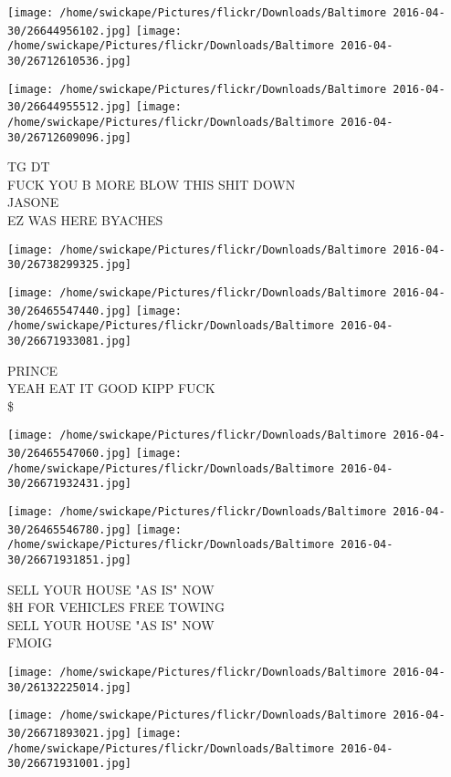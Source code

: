 \documentclass[10pt,letterpaper]{article}
\begin{document}
\texttt{[image: /home/swickape/Pictures/flickr/Downloads/Baltimore 2016-04-30/26644956102.jpg]}
\texttt{[image: /home/swickape/Pictures/flickr/Downloads/Baltimore 2016-04-30/26712610536.jpg]}

\texttt{[image: /home/swickape/Pictures/flickr/Downloads/Baltimore 2016-04-30/26644955512.jpg]}
\texttt{[image: /home/swickape/Pictures/flickr/Downloads/Baltimore 2016-04-30/26712609096.jpg]}

TG DT\\
FUCK YOU B MORE BLOW THIS SHIT DOWN\\
JASONE\\
EZ WAS HERE BYACHES\\
\pagebreak

\texttt{[image: /home/swickape/Pictures/flickr/Downloads/Baltimore 2016-04-30/26738299325.jpg]}

\vspace{0.25in}
\texttt{[image: /home/swickape/Pictures/flickr/Downloads/Baltimore 2016-04-30/26465547440.jpg]}
\texttt{[image: /home/swickape/Pictures/flickr/Downloads/Baltimore 2016-04-30/26671933081.jpg]}

PRINCE\\
YEAH EAT IT GOOD KIPP FUCK\\
\$\\
\pagebreak

\texttt{[image: /home/swickape/Pictures/flickr/Downloads/Baltimore 2016-04-30/26465547060.jpg]}
\texttt{[image: /home/swickape/Pictures/flickr/Downloads/Baltimore 2016-04-30/26671932431.jpg]}

\texttt{[image: /home/swickape/Pictures/flickr/Downloads/Baltimore 2016-04-30/26465546780.jpg]}
\texttt{[image: /home/swickape/Pictures/flickr/Downloads/Baltimore 2016-04-30/26671931851.jpg]}

SELL YOUR HOUSE "AS IS" NOW\\
\$H FOR VEHICLES FREE TOWING\\
SELL YOUR HOUSE "AS IS" NOW\\
FMOIG\\
\pagebreak

\texttt{[image: /home/swickape/Pictures/flickr/Downloads/Baltimore 2016-04-30/26132225014.jpg]}

\vspace{0.25in}
\texttt{[image: /home/swickape/Pictures/flickr/Downloads/Baltimore 2016-04-30/26671893021.jpg]}
\texttt{[image: /home/swickape/Pictures/flickr/Downloads/Baltimore 2016-04-30/26671931001.jpg]}
\end{document}
